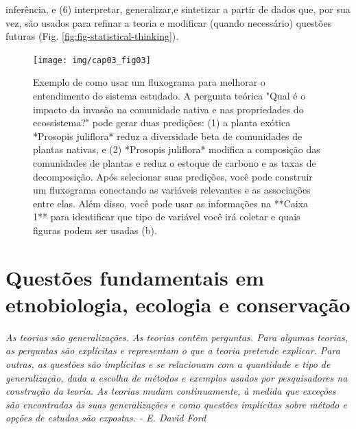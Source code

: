 \documentclass[
]{book}
\renewenvironment{quote}{\begin{VF}}{\end{VF}}
\begin{document}
inferência, e (6) interpretar, generalizar,e sintetizar a partir de dados que, por sua vez, são usados para refinar a teoria e modificar (quando necessário) questões futuras (Fig. \ref{fig:fig-statistical-thinking}).

\begin{figure}

{\centering \texttt{[image: img/cap03\_fig03]} 

}

\caption{Exemplo de como usar um fluxograma para melhorar o entendimento do sistema estudado. A pergunta teórica "Qual é o impacto da invasão na comunidade nativa e nas propriedades do ecossistema?" pode gerar duas predições: (1) a planta exótica *Prosopis juliflora* reduz a diversidade beta de comunidades de plantas nativas, e (2) *Prosopis juliflora* modifica a composição das comunidades de plantas e reduz o estoque de carbono e as taxas de decomposição. Após selecionar suas predições, você pode construir um fluxograma conectando as variáveis relevantes e as associações entre elas. Além disso, você pode usar as informações na **Caixa 1** para identificar que tipo de variável você irá coletar e quais figuras podem ser usadas (b).}\label{fig:fig-research-flowchart}
\end{figure}

\hypertarget{questuxf5es-fundamentais-em-etnobiologia-ecologia-e-conservauxe7uxe3o}{%
\section{Questões fundamentais em etnobiologia, ecologia e conservação}\label{questuxf5es-fundamentais-em-etnobiologia-ecologia-e-conservauxe7uxe3o}}

\begin{quote}
\emph{As teorias são generalizações. As teorias contêm perguntas. Para algumas teorias, as perguntas são explícitas e representam o que a teoria pretende explicar. Para outras, as questões são implícitas e se relacionam com a quantidade e tipo de generalização, dada a escolha de métodos e exemplos usados por pesquisadores na construção da teoria. As teorias mudam continuamente, à medida que exceções são encontradas às suas generalizações e como questões implícitas sobre método e opções de estudos são expostas. - E. David Ford \citeyearpar{ford_scientific_2004}}
\end{quote}
\end{document}
